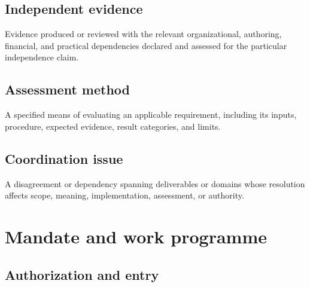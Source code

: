 \documentclass[11pt,a4paper]{article}
\begin{document}
\subsection{Independent evidence}
Evidence produced or reviewed with the relevant organizational, authoring, financial, and practical dependencies declared and assessed for the particular independence claim.

\subsection{Assessment method}
A specified means of evaluating an applicable requirement, including its inputs, procedure, expected evidence, result categories, and limits.

\subsection{Coordination issue}
A disagreement or dependency spanning deliverables or domains whose resolution affects scope, meaning, implementation, assessment, or authority.

\section{Mandate and work programme}
\subsection{Authorization and entry}
\end{document}
